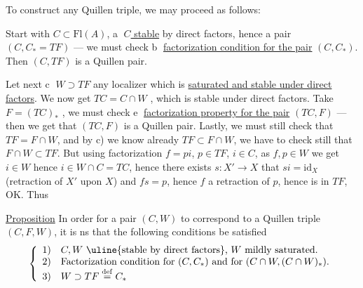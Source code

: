 

To construct any Quillen triple, we may proceed as follows:

Start with  $C\subset\mathrm{Fl}(A)$, \textcircled{a} \uline{$C$ stable} by direct factors, hence a pair $(C,C_*=TF)$ --- we must check \textcircled{b} \uline{factorization condition for the pair} $(C,C_*)$.  Then $(C,TF)$ is a Quillen pair.

Let next \textcircled{c} $\boxed{W\supset TF}$ any localizer which is  \uline{saturated and stable under direct factors}. We now get $TC=C\cap W$ , which is  stable under direct factors. Take $F=(TC)_*$ , we must check \textcircled{e} \uline{factorization property for the pair} $(TC,F)$ --- then we get that $(TC,F)$ is a Quillen pair. Lastly, we must still check that $TF=F\cap W$, and by c) we know already $TF\subset F\cap W$, we have to check still that $F\cap W\subset TF$. But using factorization $f=pi$, $p\in TF$, $i\in C$, as $f,p\in W$ we get $i\in W$ hence $i\in W\cap C=TC$, hence there exists $s:X'\to X$  that $si=\mathrm{id}_X$ (retraction of $X'$ upon $X$) and $fs=p$, hence $f$ a retraction of $p$, hence is in $TF$, OK. Thus



\uline{Proposition} In order for a pair $(C,W)$ to correspond to a Quillen triple $(C,F,W)$, it is ns that the following conditions be satisfied
\[
\left\{\begin{array}{ll}
1)&C,W\text{ \uline{stable by direct factors}, }W\text{ mildly saturated}.\\
2)&\text{Factorization condition for }(C,C_*)\text{ and for }(C\cap W,(C\cap W)_*).\\
3)&W\supset TF\overset{\mathrm{def}}{=}C_*
\end{array}\right.
\]


